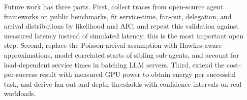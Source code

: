 \documentclass[journal]{IEEEtran}
\begin{document}
Future work has three parts. First, collect traces from open-source agent frameworks on public benchmarks, fit service-time, fan-out, delegation, and arrival distributions by likelihood and AIC, and repeat this validation against measured latency instead of simulated latency; this is the most important open step. Second, replace the Poisson-arrival assumption with Hawkes-aware approximations, model correlated starts of sibling sub-agents, and account for load-dependent service times in batching LLM servers. Third, extend the cost-per-success result with measured GPU power to obtain energy per successful task, and derive fan-out and depth thresholds with confidence intervals on real workloads.



\end{document}
